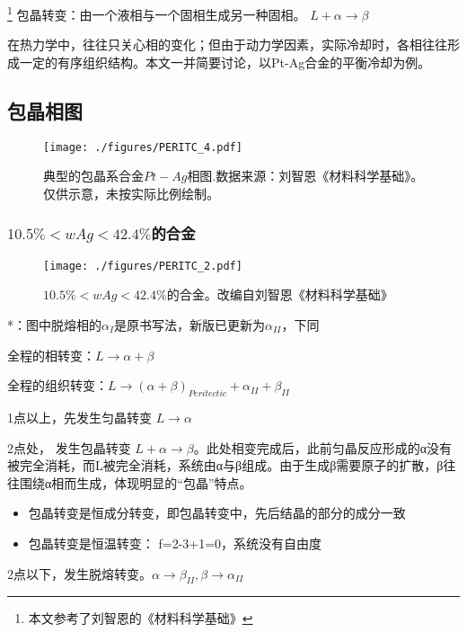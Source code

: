 
\footnote{本文参考了刘智恩的《材料科学基础》}
包晶转变：由一个液相与一个固相生成另一种固相。 $L + \alpha \rightarrow \beta$

在热力学中，往往只关心相的变化；但由于动力学因素，实际冷却时，各相往往形成一定的有序组织结构。本文一并简要讨论，以Pt-Ag合金的平衡冷却为例。

\subsection{包晶相图}

\begin{figure}[ht]
\centering
\texttt{[image: ./figures/PERITC\_4.pdf]}
\caption{典型的包晶系合金$Pt-Ag$相图.数据来源：刘智恩《材料科学基础》。仅供示意，未按实际比例绘制。} \label{PERITC_fig4}
\end{figure}

\subsubsection{$10.5\%<wAg<42.4\%$的合金} 
\begin{figure}[ht]
\centering
\texttt{[image: ./figures/PERITC\_2.pdf]}
\caption{$10.5\%<wAg<42.4\%$的合金。改编自刘智恩《材料科学基础》} \label{PERITC_fig2}
\end{figure}
*：图中脱熔相的$\alpha_I$是原书写法，新版已更新为$\alpha_{II}$，下同

全程的相转变：$L \rightarrow \alpha+\beta$

全程的组织转变：$L \rightarrow (\alpha+\beta)_{Peritectic} + \alpha_{II} + \beta_{II}$

1点以上，先发生匀晶转变 $L \rightarrow \alpha$

2点处， 发生包晶转变 $L+ \alpha \rightarrow \beta$。此处相变完成后，此前匀晶反应形成的α没有被完全消耗，而L被完全消耗，系统由α与β组成。由于生成β需要原子的扩散，β往往围绕α相而生成，体现明显的“包晶”特点。
\begin{itemize}
\item 包晶转变是恒成分转变，即包晶转变中，先后结晶的部分的成分一致
\item 包晶转变是恒温转变： f=2-3+1=0，系统没有自由度
\end{itemize}

2点以下，发生脱熔转变。$\alpha \rightarrow \beta_{II}, \beta \rightarrow \alpha_{II}$


